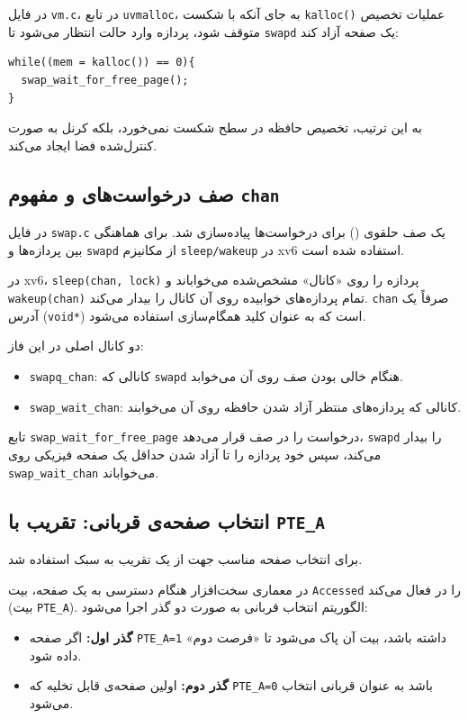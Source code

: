 \documentclass[12pt]{article}
\begin{document}
در فایل \texttt{vm.c}، در تابع \texttt{uvmalloc}، به جای آنکه با شکست \texttt{kalloc()} عملیات تخصیص متوقف شود، پردازه وارد حالت انتظار می‌شود تا \texttt{swapd} یک صفحه آزاد کند:
\begin{LTR}
\begin{lstlisting}
while((mem = kalloc()) == 0){
  swap_wait_for_free_page();
}
\end{lstlisting}
\end{LTR}

به این ترتیب، تخصیص حافظه در سطح  شکست نمی‌خورد، بلکه کرنل به صورت کنترل‌شده فضا ایجاد می‌کند.

\subsection{صف درخواست‌های  و مفهوم \texttt{chan}}
در فایل \texttt{swap.c} یک صف حلقوی () برای درخواست‌ها پیاده‌سازی شد. برای هماهنگی بین پردازه‌ها و \texttt{swapd} از مکانیزم \texttt{sleep/wakeup} در xv6 استفاده شده است.

در xv6، \texttt{sleep(chan, lock)} پردازه را روی «کانال» مشخص‌شده می‌خواباند و \texttt{wakeup(chan)} تمام پردازه‌های خوابیده روی آن کانال را بیدار می‌کند. \texttt{chan} صرفاً یک آدرس (\texttt{void*}) است که به عنوان کلید همگام‌سازی استفاده می‌شود.

دو کانال اصلی در این فاز:
\begin{itemize}
  \item \texttt{swapq\_chan}: کانالی که \texttt{swapd} هنگام خالی بودن صف روی آن می‌خوابد.
  \item \texttt{swap\_wait\_chan}: کانالی که پردازه‌های منتظر آزاد شدن حافظه روی آن می‌خوابند.
\end{itemize}

تابع \texttt{swap\_wait\_for\_free\_page} درخواست را در صف قرار می‌دهد، \texttt{swapd} را بیدار می‌کند، سپس خود پردازه را تا آزاد شدن حداقل یک صفحه فیزیکی روی \texttt{swap\_wait\_chan} می‌خواباند.

\subsection{انتخاب صفحه‌ی قربانی: تقریب  با \texttt{PTE\_A}}
برای انتخاب صفحه مناسب جهت  از یک تقریب  به سبک  استفاده شد.

در معماری  سخت‌افزار هنگام دسترسی به یک صفحه، بیت \texttt{Accessed} را در  فعال می‌کند (بیت \texttt{PTE\_A}). الگوریتم انتخاب قربانی به صورت دو گذر اجرا می‌شود:
\begin{itemize}
  \item \textbf{گذر اول:} اگر صفحه \texttt{PTE\_A=1} داشته باشد، بیت آن پاک می‌شود تا «فرصت دوم» داده شود.
  \item \textbf{گذر دوم:} اولین صفحه‌ی قابل تخلیه که \texttt{PTE\_A=0} باشد به عنوان قربانی انتخاب می‌شود.
\end{itemize}
\end{document}
